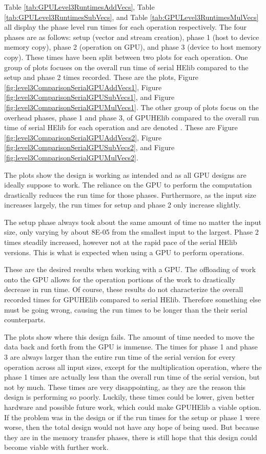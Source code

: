Table \ref{tab:GPULevel3RuntimesAddVecs}, Table \ref{tab:GPULevel3RuntimesSubVecs}, and Table \ref{tab:GPULevel3RuntimesMulVecs} all display the phase level run times for each operation respectively. The four phases are as follows: setup (vector and stream creation), phase 1 (host to device memory copy), phase 2 (operation on GPU), and phase 3 (device to host memory copy). These times have been split between two plots for each operation. One group of plots focuses on the overall run time of serial HElib compared to the setup and phase 2 times recorded. These are the  plots, Figure \ref{fig:level3ComparisonSerialGPUAddVecs1}, Figure \ref{fig:level3ComparisonSerialGPUSubVecs1}, and Figure \ref{fig:level3ComparisonSerialGPUMulVecs1}. The other group of plots focus on the overhead phases, phase 1 and phase 3, of GPUHElib compared to the overall run time of serial HElib for each operation and are denoted . These are Figure \ref{fig:level3ComparisonSerialGPUAddVecs2}, Figure \ref{fig:level3ComparisonSerialGPUSubVecs2}, and Figure \ref{fig:level3ComparisonSerialGPUMulVecs2}.

The  plots show the design is working as intended and as all GPU designs are ideally suppose to work. The reliance on the GPU to perform the computation drastically reduces the run time for those phases. Furthermore, as the input size increases largely, the run times for setup and phase 2 only increase slightly. 

The setup phase always took about the same amount of time no matter the input size, only varying by about 8E-05 from the smallest input to the largest. Phase 2 times steadily increased, however not at the rapid pace of the serial HElib versions. This is what is expected when using a GPU to perform operations.

These are the desired results when working with a GPU. The offloading of work onto the GPU allows for the operation portions of the work to drastically decrease in run time. Of course, these results do not characterize the overall recorded times for GPUHElib compared to serial HElib. Therefore something else must be going wrong, causing the run times to be longer than the their serial counterparts.

The  plots show where this design fails. The amount of time needed to move the data back and forth from the GPU is immense. The times for phase 1 and phase 3 are always larger than the entire run time of the serial version for every operation across all input sizes, except for the multiplication operation, where the phase 1 times are actually less than the overall run time of the serial version, but not by much. These times are very disappointing, as they are the reason this design is performing so poorly. Luckily, these times could be lower, given better hardware and possible future work, which could make GPUHElib a viable option. If the problem was in the design or if the run times for the setup or phase 1 were worse, then the total design would not have any hope of being used. But because they are in the memory transfer phases, there is still hope that this design could become viable with further work.

